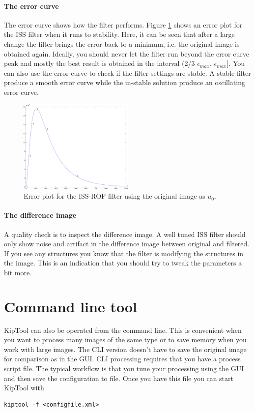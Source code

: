 \documentclass[a4paper]{scrreprt}
\begin{document}
\subsubsection{The error curve}
The error curve shows how the filter performs. Figure \ref{fig_iss_errorplot} shows an error plot for the ISS filter when it runs to stability. Here, it can be seen that after a large change the filter brings the error back to a minimum, i.e. the original image is obtained again. Ideally, you should never let the filter run beyond the error curve peak and mostly the best result is obtained in the interval (2/3 $\epsilon_{max}$, $\epsilon_{max}$]. You can also use the error curve to check if the filter settings are stable. A stable filter produce a smooth error curve while the in-stable solution produce an oscillating error curve.
\begin{figure}[ht!]
\centering
\includegraphics[width=0.5\textwidth]{figures/iss_module/errorplot.pdf}
\caption{Error plot for the ISS-ROF filter using the original image as $u_0$.}\label{fig_iss_errorplot}
\end{figure}

\subsubsection{The difference image}
A quality check is to inspect the difference image. A well tuned ISS filter should only show noise and artifact in the difference image between original and filtered. If you see any structures you know that the filter is modifying the structures in the image. This is an indication that you should try to tweak the parameters a bit more.

\chapter{Command line tool}
KipTool can also be operated from the command line. This is convenient when you want to process many images of the same type or to save memory when you work with large images. The CLI version doesn't have to save the original image for comparison as in the GUI. CLI processing requires that you have a process script file. The typical workflow is that you tune your processing using the GUI and then save the configuration to file. Once you have this file you can start KipTool with
\begin{verbatim}
kiptool -f <configfile.xml>
\end{verbatim}
\end{document}
